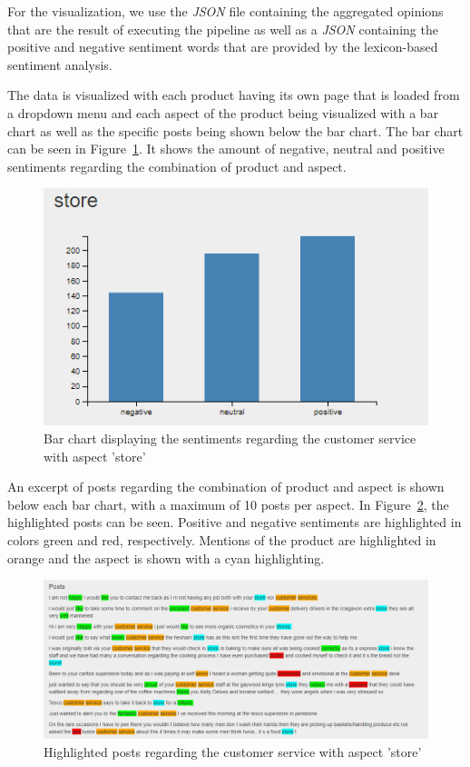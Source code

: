 \documentclass[10pt,a4paper]{article}
\begin{document}
		For the visualization, we use the \textit{JSON} file containing the aggregated opinions that are the result of executing the pipeline as well as a \textit{JSON} containing the positive and negative sentiment words that are provided by the lexicon-based sentiment analysis.
	
		The data is visualized with each product having its own page that is loaded from a dropdown menu and each aspect of the product being visualized with a bar chart as well as the specific posts being shown below the bar chart. The bar chart can be seen in Figure~\ref{fig:barchart}. It shows the amount of negative, neutral and positive sentiments regarding the combination of product and aspect.
	
		\begin{figure}[h]
			\centering
			\includegraphics[width=0.7\linewidth]{data/barchart}
			\caption{Bar chart displaying the sentiments regarding the customer service with aspect 'store'}
			\label{fig:barchart}
		\end{figure}
			
		An excerpt of posts regarding the combination of product and aspect is shown below each bar chart, with a maximum of 10 posts per aspect. In Figure~\ref{fig:posts}, the highlighted posts can be seen. Positive and negative sentiments are highlighted in colors green and red, respectively. Mentions of the product are highlighted in orange and the aspect is shown with a cyan highlighting.
			
		\begin{figure}[h]
			\centering
			\includegraphics[width=0.9\linewidth]{data/posts}
			\caption{Highlighted posts regarding the customer service with aspect 'store'}
			\label{fig:posts}
		\end{figure}
	
\end{document}
